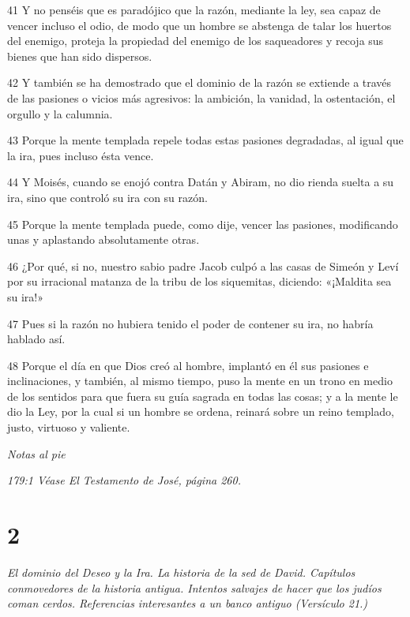 \par 41 Y no penséis que es paradójico que la razón, mediante la ley, sea capaz de vencer incluso el odio, de modo que un hombre se abstenga de talar los huertos del enemigo, proteja la propiedad del enemigo de los saqueadores y recoja sus bienes que han sido dispersos.

\par 42 Y también se ha demostrado que el dominio de la razón se extiende a través de las pasiones o vicios más agresivos: la ambición, la vanidad, la ostentación, el orgullo y la calumnia.

\par 43 Porque la mente templada repele todas estas pasiones degradadas, al igual que la ira, pues incluso ésta vence.

\par 44 Y Moisés, cuando se enojó contra Datán y Abiram, no dio rienda suelta a su ira, sino que controló su ira con su razón.

\par 45 Porque la mente templada puede, como dije, vencer las pasiones, modificando unas y aplastando absolutamente otras.

\par 46 ¿Por qué, si no, nuestro sabio padre Jacob culpó a las casas de Simeón y Leví por su irracional matanza de la tribu de los siquemitas, diciendo: «¡Maldita sea su ira!»

\par 47 Pues si la razón no hubiera tenido el poder de contener su ira, no habría hablado así.

\par 48 Porque el día en que Dios creó al hombre, implantó en él sus pasiones e inclinaciones, y también, al mismo tiempo, puso la mente en un trono en medio de los sentidos para que fuera su guía sagrada en todas las cosas; y a la mente le dio la Ley, por la cual si un hombre se ordena, reinará sobre un reino templado, justo, virtuoso y valiente.

\par \textit{Notas al pie}

\par \textit{179:1 Véase El Testamento de José, página 260.}

\chapter{2}

\par \textit{El dominio del Deseo y la Ira. La historia de la sed de David. Capítulos conmovedores de la historia antigua. Intentos salvajes de hacer que los judíos coman cerdos. Referencias interesantes a un banco antiguo (Versículo 21.)}

